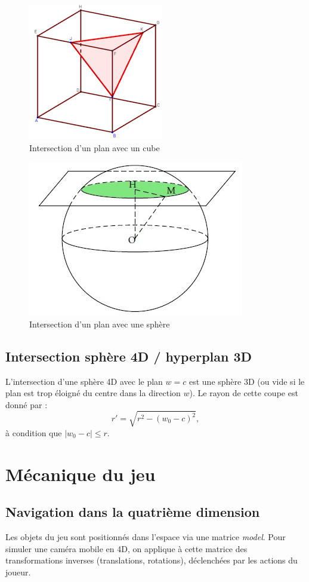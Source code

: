 \documentclass[11pt,a4paper]{article}
\begin{document}
\begin{figure}[h]
	\centering
	\includegraphics[width=0.3\linewidth]{intersection-cube}
	\caption{Intersection d’un plan avec un cube}
	\label{fig:inter-plan-cube}
\end{figure}

\begin{figure}
	\centering
	\includegraphics[width=0.3\linewidth]{intersection-sphere}
	\caption{Intersection d’un plan avec une sphère}
	\label{fig:inter-plan-sphere}
\end{figure}

\subsection{Intersection sphère 4D / hyperplan 3D}

L’intersection d’une sphère 4D avec le plan $w = c$ est une sphère 3D (ou vide si le plan est trop éloigné du centre dans la direction $w$). Le rayon de cette coupe est donné par :
\[
	r' = \sqrt{r^2 - (w_0 - c)^2},
\]
à condition que $|w_0 - c| \leq r$.

\section{Mécanique du jeu}

\subsection{Navigation dans la quatrième dimension}

Les objets du jeu sont positionnés dans l’espace via une matrice \textit{model}. Pour simuler une caméra mobile en 4D, on applique à cette matrice des transformations inverses (translations, rotations), déclenchées par les actions du joueur.
\end{document}
